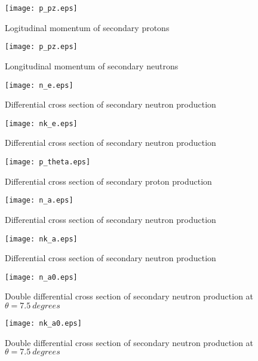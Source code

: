 \documentclass[12pt]{article}
\begin{document}
\newpage

\begin{figure}[htbp]
\caption{Logitudinal momentum of secondary protons}
\label{fig5}  
\centerline{\texttt{[image: p\_pz.eps]}}
\end{figure}
\begin{figure}[htbp]
\caption{Longitudinal momentum of secondary neutrons}
\label{fig6} 
\centerline{\texttt{[image: p\_pz.eps]}}
\end{figure}

\newpage

\begin{figure}[htbp]
\caption{Differential cross section of secondary neutron production}
\label{fig7}  
\centerline{\texttt{[image: n\_e.eps]}}
\end{figure}
\begin{figure}[htbp]
\caption{Differential cross section of secondary neutron production}
\label{fig8}  
\centerline{\texttt{[image: nk\_e.eps]}}
\end{figure}
\begin{figure}[htbp]
\caption{Differential cross section of secondary proton production}
\label{fig9} 
\centerline{\texttt{[image: p\_theta.eps]}}
\end{figure}
\begin{figure}[htbp]
\caption{Differential cross section of secondary neutron production}
\label{fig10} 
\centerline{\texttt{[image: n\_a.eps]}}
\end{figure}
\begin{figure}[htbp]
\caption{Differential cross section of secondary neutron production}
\label{fig10a} 
\centerline{\texttt{[image: nk\_a.eps]}}
\end{figure}

\clearpage


\begin{figure}[htbp]
\caption{Double differential cross section of secondary neutron production at $\theta = 7.5~degrees$}
\label{figa0} 
\centerline{\texttt{[image: n\_a0.eps]}}
\end{figure}

\begin{figure}[htbp]
\caption{Double differential cross section of secondary neutron production at $\theta = 7.5~degrees$}
\label{figa0a} 
\centerline{\texttt{[image: nk\_a0.eps]}}
\end{figure}
\end{document}
